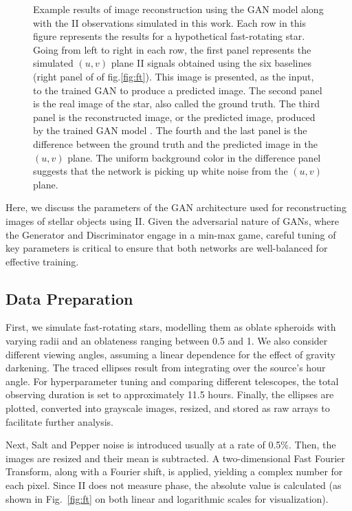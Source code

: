 \begin{figure}
\caption{Example results of image reconstruction using the GAN model along with the II observations simulated in this work. Each row in this figure represents the results for a hypothetical fast-rotating star. Going from left to right in each row, the first panel represents the simulated $(u,v)$ plane II signals obtained using the six baselines (right panel of of fig.\ref{fig:ft}). This image is presented, as the input, to the trained GAN to produce a predicted image. The second panel is the real image of the star, also called the ground truth. The third panel is the reconstructed image, or the predicted image, produced by the trained GAN model . The fourth and the last panel is the difference between the ground truth and the predicted image in the $(u,v)$ plane. The uniform background color in the difference panel suggests that the network is picking up white noise from the $(u,v)$ plane. }
	\label{fig:GAN}
\end{figure}
Here, we discuss the parameters of the GAN architecture used for reconstructing images of stellar objects using II. Given the adversarial nature of GANs, where the Generator and Discriminator engage in a min-max game, careful tuning of key parameters is critical to ensure that both networks are well-balanced for effective training.

\subsection{Data Preparation}
First, we simulate fast-rotating stars, modelling them as oblate spheroids with varying radii and an oblateness ranging between 0.5 and 1. We also consider different viewing angles, assuming a linear dependence for the effect of gravity darkening. The traced ellipses result from integrating over the source's hour angle. For hyperparameter tuning and comparing different telescopes, the total observing duration is set to approximately 11.5 hours. Finally, the ellipses are plotted, converted into grayscale images, resized, and stored as raw arrays to facilitate further analysis.

Next, Salt and Pepper noise is introduced usually at a rate of 0.5\%. Then, the images are resized and their mean is subtracted. A two-dimensional Fast Fourier Transform, along with a Fourier shift, is applied, yielding a complex number for each pixel. Since II does not measure phase, the absolute value is calculated (as shown in Fig.~\ref{fig:ft} on both linear and logarithmic scales for visualization). 


